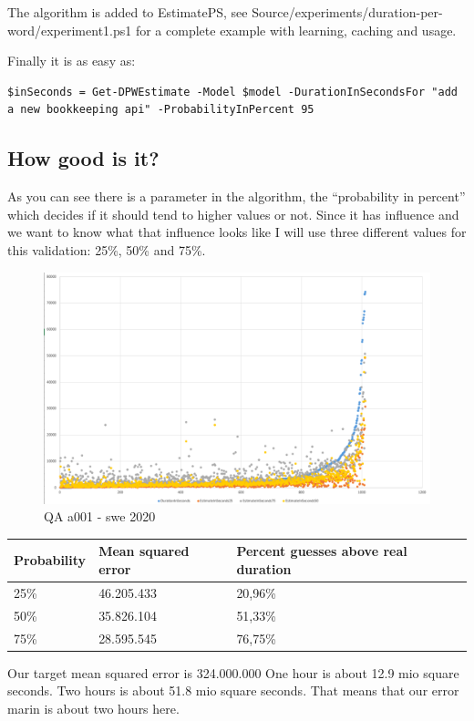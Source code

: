 The algorithm is added to EstimatePS, see
Source/experiments/duration-per-word/experiment1.ps1 for a complete
example with learning, caching and usage.

Finally it is as easy as:

\begin{verbatim}
$inSeconds = Get-DPWEstimate -Model $model -DurationInSecondsFor "add a new bookkeeping api" -ProbabilityInPercent 95
\end{verbatim}

\hypertarget{how-good-is-it}{%
\subsection{How good is it?}}

As you can see there is a parameter in the algorithm, the ``probability
in percent'' which decides if it should tend to higher values or not.
Since it has influence and we want to know what that influence looks
like I will use three different values for this validation: 25\%, 50\%
and 75\%.

\begin{figure}
\centering
\includegraphics[width=\textwidth]{Documentation/10000-A001/a001-swe2020.png}
\caption{QA a001 - swe 2020}
\end{figure}

\begin{longtable}[]{@{}lll@{}}
Probability & Mean squared error & Percent guesses above real
duration\tabularnewline
\endhead
25\% & 46.205.433 & 20,96\%\tabularnewline
50\% & 35.826.104 & 51,33\%\tabularnewline
75\% & 28.595.545 & 76,75\%\tabularnewline
\end{longtable}

Our target mean squared error is 324.000.000 One hour is about 12.9 mio
square seconds. Two hours is about 51.8 mio square seconds. That means
that our error marin is about two hours here.


